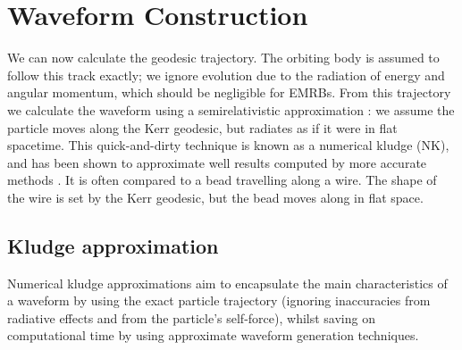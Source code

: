 \section{Waveform Construction}\label{sec:Kludge}

We can now calculate the geodesic trajectory. The orbiting body is assumed to follow this track exactly; we ignore evolution due to the radiation of energy and angular momentum, which should be negligible for EMRBs. From this trajectory we calculate the waveform using a semirelativistic approximation \citep{Ruffini1981}: we assume the particle moves along the Kerr geodesic, but radiates as if it were in flat spacetime. This quick-and-dirty technique is known as a numerical kludge (NK), and has been shown to approximate well results computed by more accurate methods \citep{Babak2007}. It is often compared to a bead travelling along a wire. The shape of the wire is set by the Kerr geodesic, but the bead moves along in flat space.

\subsection{Kludge approximation}

Numerical kludge approximations aim to encapsulate the main characteristics of a waveform by using the exact particle trajectory (ignoring inaccuracies from radiative effects and from the particle's self-force), whilst saving on computational time by using approximate waveform generation techniques.

